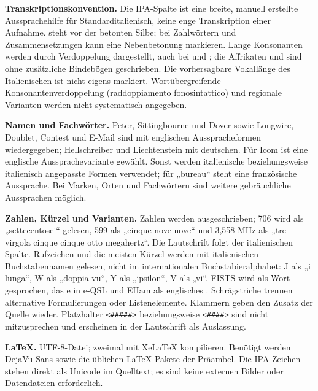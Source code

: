 \documentclass[a4paper,landscape,10pt]{article}
\newcommand{\ipa}[1]{{\ipafont[#1]}}
\begin{document}
\medskip
\textbf{Transkriptionskonvention.} Die IPA-Spalte ist eine breite, manuell erstellte Aussprachehilfe für
Standarditalienisch, keine enge Transkription einer Aufnahme. \ipa{ˈ} steht vor der betonten Silbe;
bei Zahlwörtern und Zusammensetzungen kann \ipa{ˌ} eine Nebenbetonung markieren. Lange Konsonanten
werden durch Verdoppelung dargestellt, auch bei \ipa{ɲɲ} und \ipa{ʎʎ}; die Affrikaten \ipa{ts} und
\ipa{tʃ} sind ohne zusätzliche Bindebögen geschrieben. Die vorhersagbare Vokallänge des Italienischen
ist nicht eigens markiert. Wortübergreifende Konsonantenverdoppelung (raddoppiamento fonosintattico)
und regionale Varianten werden nicht systematisch angegeben.

\medskip
\textbf{Namen und Fachwörter.} Peter, Sittingbourne und Dover sowie Longwire, Doublet, Contest und
E-Mail sind mit englischen Ausspracheformen wiedergegeben; Hellschreiber und Liechtenstein mit deutschen.
Für Icom ist eine englische Aussprachevariante gewählt. Sonst werden italienische beziehungsweise
italienisch angepasste Formen verwendet; für „bureau“ steht eine französische Aussprache.
Bei Marken, Orten und Fachwörtern sind weitere gebräuchliche Aussprachen möglich.

\medskip
\textbf{Zahlen, Kürzel und Varianten.} Zahlen werden ausgeschrieben; 706 wird als „settecentosei“ gelesen,
599 als „cinque nove nove“ und 3,558 MHz als „tre virgola cinque cinque otto megahertz“.
Die Lautschrift folgt der italienischen Spalte. Rufzeichen und die meisten Kürzel werden mit italienischen
Buchstabennamen gelesen, nicht im internationalen Buchstabieralphabet: J als „i lunga“, W als „doppia vu“,
Y als „ipsilon“, V als „vi“. FISTS wird als Wort gesprochen, das e in e-QSL und EHam als englisches \ipa{i}.
Schrägstriche trennen alternative Formulierungen oder Listenelemente. Klammern geben den Zusatz der Quelle
wieder. Platzhalter \texttt{<\#\#\#\#\#>} beziehungsweise \texttt{<\#\#\#\#>} sind nicht mitzusprechen
und erscheinen in der Lautschrift als Auslassung.

\medskip
\textbf{LaTeX.} UTF-8-Datei; zweimal mit XeLaTeX kompilieren. Benötigt werden DejaVu Sans sowie die
üblichen LaTeX-Pakete der Präambel. Die IPA-Zeichen stehen direkt als Unicode im Quelltext;
es sind keine externen Bilder oder Datendateien erforderlich.
\end{document}
